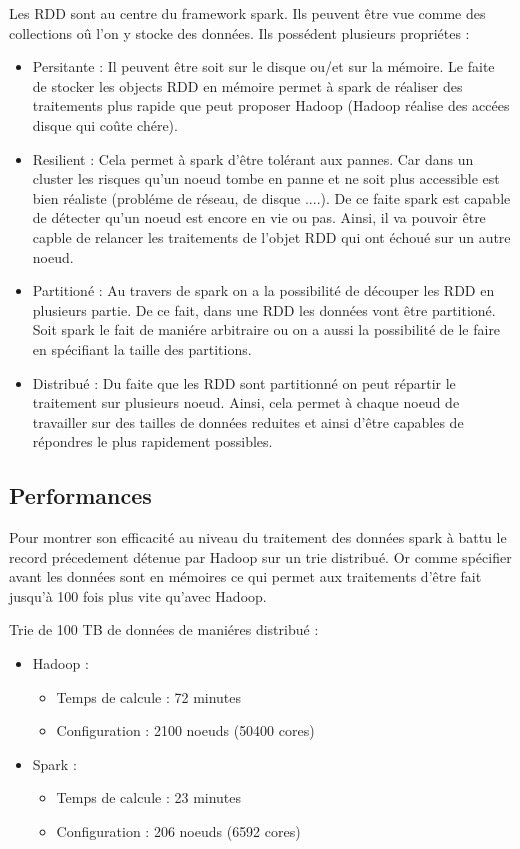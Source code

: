 Les RDD sont au centre du framework spark. Ils peuvent être vue comme des collections oû l'on y stocke des données. Ils possédent plusieurs propriétes :
\newline
\begin{itemize}
	\item Persitante : Il peuvent être soit sur le disque ou/et sur la mémoire. Le faite de stocker les objects RDD en mémoire permet à spark de réaliser des traitements plus rapide que peut proposer Hadoop (Hadoop réalise des accées disque qui coûte chére).
	\item Resilient : Cela permet à spark d'être tolérant aux pannes. Car dans un cluster les risques qu'un noeud tombe en panne et ne soit plus accessible est bien réaliste (probléme de réseau, de disque ....). De ce faite spark est capable de détecter qu'un noeud est encore en vie ou pas. Ainsi, il va pouvoir être capble de relancer les traitements de l'objet RDD qui ont échoué sur un autre noeud.
	\item Partitioné : Au travers de spark on a la possibilité de découper les RDD en plusieurs partie. De ce fait, dans une RDD les données vont être partitioné. Soit spark le fait de maniére arbitraire ou on a aussi la possibilité de le faire en spécifiant la taille des partitions.
	\item Distribué : Du faite que les RDD sont partitionné on peut répartir le traitement sur plusieurs noeud. Ainsi, cela permet à chaque noeud de travailler sur des tailles de données reduites et ainsi d'être capables de répondres le plus rapidement possibles.
\end{itemize}

\subsection{Performances}

Pour montrer son efficacité au niveau du traitement des données spark à battu le record précedement détenue par Hadoop sur un trie distribué. Or comme spécifier avant les données sont en mémoires ce qui permet aux traitements d'être fait jusqu'à 100 fois plus vite qu'avec Hadoop.
\newline

Trie de 100 TB de données de maniéres distribué :
\newline
\begin{itemize}
	\item Hadoop :
        \begin{itemize}
            \item Temps de calcule : 72 minutes
            \item Configuration : 2100 noeuds (50400 cores)
        \end{itemize}
	\item Spark :
		\begin{itemize}
        	\item Temps de calcule : 23 minutes
        	\item Configuration : 206 noeuds (6592 cores)
        \end{itemize}
\end{itemize}
